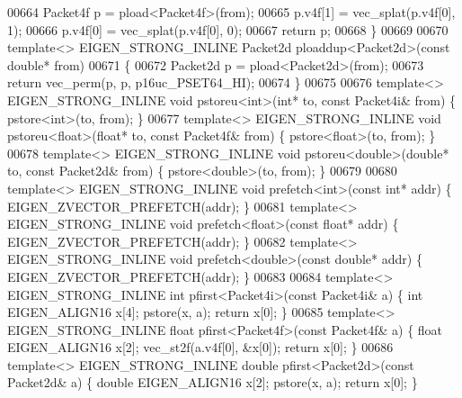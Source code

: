\begin{DoxyCode}
{00664   Packet4f p = pload<Packet4f>(from);
00665   p.v4f[1] = vec\_splat(p.v4f[0], 1);
00666   p.v4f[0] = vec\_splat(p.v4f[0], 0);
00667   \textcolor{keywordflow}{return} p;
00668 \}
00669 
00670 \textcolor{keyword}{template}<> EIGEN\_STRONG\_INLINE Packet2d ploaddup<Packet2d>(\textcolor{keyword}{const} \textcolor{keywordtype}{double}*   from)
00671 \{
00672   Packet2d p = pload<Packet2d>(from);
00673   \textcolor{keywordflow}{return} vec\_perm(p, p, p16uc\_PSET64\_HI);
00674 \}
00675 
00676 \textcolor{keyword}{template}<> EIGEN\_STRONG\_INLINE \textcolor{keywordtype}{void} pstoreu<int>(\textcolor{keywordtype}{int}*        to, \textcolor{keyword}{const} Packet4i& from) \{ pstore<int>(to, 
      from); \}
00677 \textcolor{keyword}{template}<> EIGEN\_STRONG\_INLINE \textcolor{keywordtype}{void} pstoreu<float>(\textcolor{keywordtype}{float}*    to, \textcolor{keyword}{const} Packet4f& from) \{ pstore<float>(to, 
      from); \}
00678 \textcolor{keyword}{template}<> EIGEN\_STRONG\_INLINE \textcolor{keywordtype}{void} pstoreu<double>(\textcolor{keywordtype}{double}*  to, \textcolor{keyword}{const} Packet2d& from) \{ pstore<double>(to,
       from); \}
00679 
00680 \textcolor{keyword}{template}<> EIGEN\_STRONG\_INLINE \textcolor{keywordtype}{void} prefetch<int>(\textcolor{keyword}{const} \textcolor{keywordtype}{int}*       addr) \{ EIGEN\_ZVECTOR\_PREFETCH(addr); \}
00681 \textcolor{keyword}{template}<> EIGEN\_STRONG\_INLINE \textcolor{keywordtype}{void} prefetch<float>(\textcolor{keyword}{const} \textcolor{keywordtype}{float}*   addr) \{ EIGEN\_ZVECTOR\_PREFETCH(addr); \}
00682 \textcolor{keyword}{template}<> EIGEN\_STRONG\_INLINE \textcolor{keywordtype}{void} prefetch<double>(\textcolor{keyword}{const} \textcolor{keywordtype}{double}* addr) \{ EIGEN\_ZVECTOR\_PREFETCH(addr); \}
00683 
00684 \textcolor{keyword}{template}<> EIGEN\_STRONG\_INLINE \textcolor{keywordtype}{int}    pfirst<Packet4i>(\textcolor{keyword}{const} Packet4i& a) \{ \textcolor{keywordtype}{int}    EIGEN\_ALIGN16 x[4]; 
      pstore(x, a); \textcolor{keywordflow}{return} x[0]; \}
00685 \textcolor{keyword}{template}<> EIGEN\_STRONG\_INLINE \textcolor{keywordtype}{float}  pfirst<Packet4f>(\textcolor{keyword}{const} Packet4f& a) \{ \textcolor{keywordtype}{float}  EIGEN\_ALIGN16 x[2]; 
      vec\_st2f(a.v4f[0], &x[0]); \textcolor{keywordflow}{return} x[0]; \}
00686 \textcolor{keyword}{template}<> EIGEN\_STRONG\_INLINE \textcolor{keywordtype}{double} pfirst<Packet2d>(\textcolor{keyword}{const} Packet2d& a) \{ \textcolor{keywordtype}{double} EIGEN\_ALIGN16 x[2]; 
      pstore(x, a); \textcolor{keywordflow}{return} x[0]; \}
}
\end{DoxyCode}
